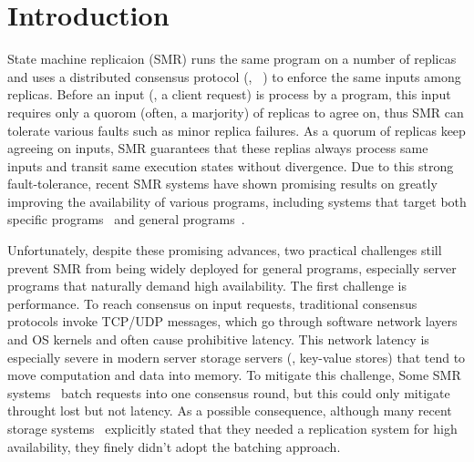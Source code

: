 \section{Introduction} \label{sec:intro}

State machine replicaion (SMR) runs the same program on a 
number of replicas and uses a distributed consensus protocol (\eg, 
\paxos~\cite{crane:sosp15}) to enforce the same inputs among 
replicas. Before an input (\eg, a client request) is process by 
a program, this input requires only a quorom (often, a marjority) of 
replicas to agree on, thus SMR can tolerate various faults such as minor replica 
failures. As a quorum of replicas keep agreeing on inputs, SMR guarantees that 
these replias always process same inputs and transit same execution states 
without divergence. Due to this strong fault-tolerance, recent SMR systems have 
shown promising results on greatly improving the availability of various 
programs, including systems that target both specific 
programs~\cite{chubby:osdi, zookeeper} and general 
programs~\cite{crane:sosp15,eve:osdi12,rex:eurosys14}.

Unfortunately, despite these promising advances, two practical challenges still 
prevent SMR from being widely deployed for general programs, especially 
server programs that naturally demand high availability. The first challenge is 
performance. To reach consensus on input requests, traditional consensus 
protocols invoke TCP/UDP messages, which go through software network layers 
and OS kernels and often cause prohibitive latency. This network latency is 
especially severe in modern server storage servers (\eg, key-value stores) that 
tend to move computation and data into memory. To mitigate this challenge, Some 
SMR systems~\cite{calvin:sigmod12,rex:eusorys14} batch requests into one 
consensus round, but this could only mitigate throught lost but not latency. As 
a possible consequence, although many recent storage systems~\cite{drtm} 
explicitly stated that they needed a replication system for high availability, 
they finely didn't adopt the batching approach.

